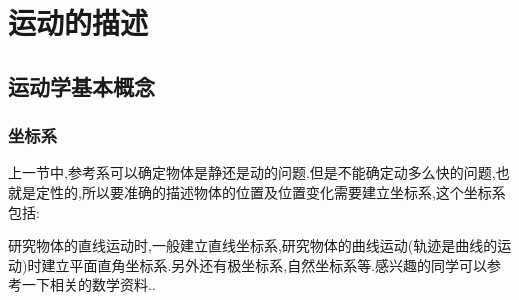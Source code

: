 \documentclass[a4paper,fontset = windowsnew]{ctexbook}
\begin{document}
\chapter{运动的描述}
\section{运动学基本概念}
\subsection{坐标系}
上一节中,参考系可以确定物体是静还是动的问题.但是不能确定动多么快的问题,也就是定性的,所以要准确的描述物体的位置及位置变化需要建立坐标系,这个坐标系包括:

研究物体的直线运动时,一般建立直线坐标系,研究物体的曲线运动(轨迹是曲线的运动)时建立平面直角坐标系.另外还有极坐标系,自然坐标系等.感兴趣的同学可以参考一下相关的数学资料..
\end{document}
